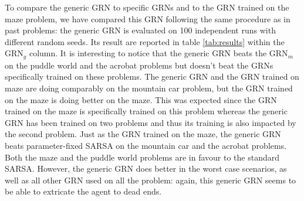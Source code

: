 To compare the generic GRN to specific GRNs and to the GRN trained on the maze problem, we have compared this GRN following the same procedure as in past problems: the generic GRN is evaluated on 100 independent runs with different random seeds. Its result are reported in table \ref{tab:results} within the GRN$_g$ column. It is interesting to notice that the generic GRN beats the GRN$_m$ on the puddle world and the acrobat problems but doesn't beat the GRNs specifically trained on these problems. The generic GRN and the GRN trained on maze are doing comparably on the mountain car problem, but the GRN trained on the maze is doing better on the maze. This was expected since the GRN trained on the maze is specifically trained on this problem whereas the generic GRN has been trained on two problems and thus its training is also impacted by the second problem. Just as the GRN trained on the maze, the generic GRN beats parameter-fixed SARSA on the mountain car and the acrobat problems. Both the maze and the puddle world problems are in favour to the standard SARSA. However, the generic GRN does better in the worst case scenarios, as well as all other GRN used on all the problem: again, this generic GRN seems to be able to extricate the agent to dead ends.


